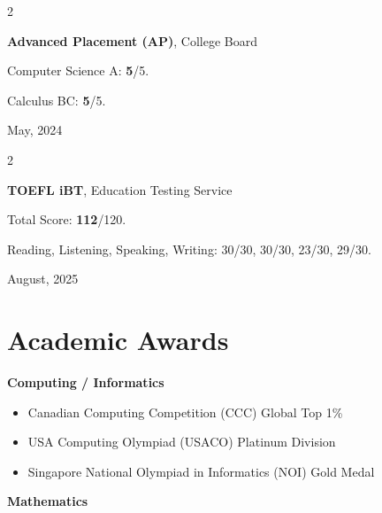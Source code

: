 \documentclass[10pt, letterpaper]{article}
\newenvironment{highlights}{
    \begin{itemize}[
        topsep=0.10 cm,
        parsep=0.10 cm,
        partopsep=0pt,
        itemsep=0pt,
        leftmargin=0.4 cm + 10pt
    ]
}{
    \end{itemize}
} %
\newenvironment{twocolentry}[2][]{
    \onecolentry
    \def\secondColumn{#2}
    \setcolumnwidth{\fill, 4.5 cm}
    \begin{paracol}{2}
}{
    \switchcolumn \raggedleft \secondColumn
    \end{paracol}
    \endonecolentry
} %
\begin{document}
    \vspace{0.2cm}

    \begin{twocolentry}{May, 2024}
        \setlength{\parindent}{20pt}

        \textbf{Advanced Placement (AP)}, College Board

        \vspace{5pt}

        Computer Science A: \textbf{5}/5.

        Calculus BC: \textbf{5}/5.
        
    \end{twocolentry}
    
    \vspace{0.2cm}

    \begin{twocolentry}{August, 2025}
        \setlength{\parindent}{20pt}

        \textbf{TOEFL iBT}, Education Testing Service

        \vspace{5pt}

        Total Score: \textbf{112}/120.

        Reading, Listening, Speaking, Writing: 30/30, 30/30, 23/30, 29/30.
        
    \end{twocolentry}

    \section{Academic Awards}

    
    \textbf{Computing / Informatics}

    \begin{highlights}
        \item Canadian Computing Competition (CCC) \hfill Global Top 1\%

        \item USA Computing Olympiad (USACO) \hfill Platinum Division
        
        \item Singapore National Olympiad in Informatics (NOI) \hfill Gold Medal
    \end{highlights}

    \textbf{Mathematics}
    
\end{document}
